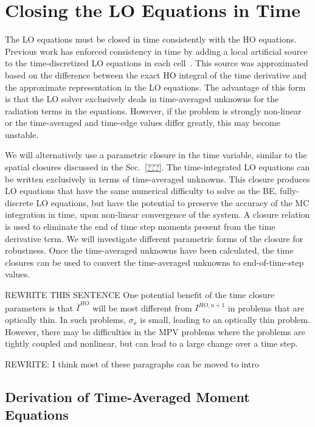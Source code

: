 \section{Closing the LO Equations in Time}

The LO equations must be closed in time consistently with the HO
equations.   Previous work has enforced
consistency in time by adding a local artificial source to the time-discretized LO
equations in each cell~\cite{holo_rh}.  This
source was approximated based on the difference between the exact HO integral of the time
derivative and the approximate representation in the LO equations. The advantage
of this form is that the LO solver exclusively deals in
time-averaged unknowns for the radiation terms in the equations.  However, if the problem
is strongly non-linear or the time-averaged and time-edge
values differ greatly, this may become unstable.

We will alternatively use a
parametric closure in the time variable, similar to the spatial closures discussed in the
Sec.~\ref{???}.  The time-integrated LO equations can be written exclusively in terms
of time-averaged unknowns.  This closure
produces LO equations that have the same numerical difficulty to solve as the BE,
fully-discrete LO equations, but
have the potential to preserve the accuracy of the MC integration in time, upon non-linear
convergence of the system.   A closure relation is used to eliminate
the end of time step moments present from the time derivative term.   We will investigate different parametric forms of the closure for robustness.   Once the time-averaged unknowns have been calculated,
the time closures can be used to convert the time-averaged unknowns to end-of-time-step
values.

REWRITE THIS SENTENCE
One potential benefit of the time closure parameters is that $\overline I^{HO}$ will be
most different from $I^{HO,n+1}$ in problems that are optically thin.  In such problems,
$\sigma_a$ is small, leading to an optically thin problem.  However, there may be
difficulties in the MPV problems where the problems are tightly coupled and nonlinear, but
can lead to a large change over a time step.

REWRITE: I think most of these paragraphs can be moved to intro

\subsection{Derivation of Time-Averaged Moment Equations}

